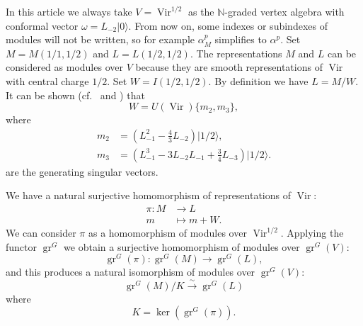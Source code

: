 \documentclass[12pt, a4paper]{article}
\theoremstyle{remark}
\DeclareMathOperator{\Vir}{Vir}
\DeclareMathOperator{\gr}{gr}
\newcommand{\vac}{|0\rangle}
\newcommand{\vachalf}{|1/2\rangle}
\begin{document}
In this article we always take $V = \Vir^{1/2}$ as the $\mathbb{N}$-graded vertex algebra with conformal vector $\omega = L_{-2}\vac$.
From now on, some indexes or subindexes of modules will not be written, so for example $\alpha^p_M$ simplifies to $\alpha^p$.
Set $M = M(1/1, 1/2)$ and $L = L(1/2, 1/2)$.
The representations $M$ and $L$ can be considered as modules over $V$ because they are smooth representations of $\Vir$ with central charge $1/2$.
Set $W = I(1/2, 1/2)$.
By definition we have $L = M/W$.
It can be shown (cf.\ \cite{feigin_verma_1984} and \cite{astashkevich_structure_1997}) that
\begin{equation}
  \label{eq:4}
  W = U(\Vir)\{m_2, m_3\},
\end{equation}
where
\begin{align*}
  m_2 &= \left(L_{-1}^2 - \tfrac{4}{3}L_{-2}\right)\vachalf, \\
  m_3 &= \left(L_{-1}^3 - 3L_{-2}L_{-1} + \tfrac{3}{4}L_{-3}\right)\vachalf.
\end{align*}
are the generating singular vectors.

We have a natural surjective homomorphism of representations of $\Vir$:
\begin{align*}
  \pi: M &\to L \\
  m &\mapsto m + W.
\end{align*}
We can consider $\pi$ as a homomorphism of modules over $\Vir^{1/2}$.
Applying the functor $\gr^G$ we obtain a surjective homomorphism of modules over $\gr^G(V)$:
\begin{equation*}
  \gr^G(\pi): \gr^G(M) \to \gr^G(L),
\end{equation*}
and this produces a natural isomorphism of modules over $\gr^G(V)$:
\begin{equation*}
  \gr^G(M)/K \xrightarrow{\sim} \gr^G(L)
\end{equation*}
where
\begin{equation}
  \label{eq:5}
  K = \ker(\gr^G(\pi)).
\end{equation}
\end{document}
